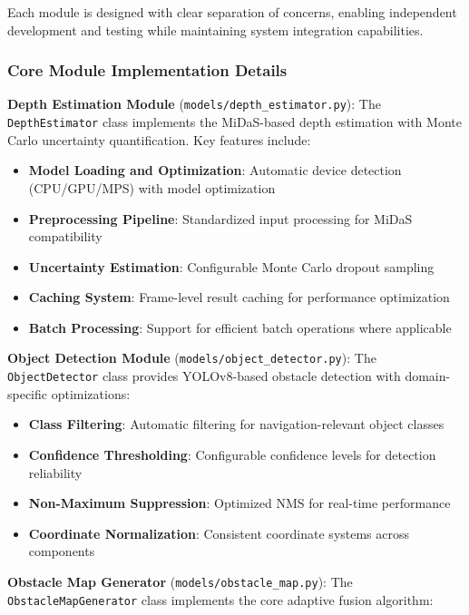 \documentclass[10pt]{article}
\begin{document}
Each module is designed with clear separation of concerns, enabling independent development and testing while maintaining system integration capabilities.

\subsubsection{Core Module Implementation Details}

\textbf{Depth Estimation Module} (\texttt{models/depth\_estimator.py}):
The \texttt{DepthEstimator} class implements the MiDaS-based depth estimation with Monte Carlo uncertainty quantification. Key features include:

\begin{itemize}
\item \textbf{Model Loading and Optimization}: Automatic device detection (CPU/GPU/MPS) with model optimization
\item \textbf{Preprocessing Pipeline}: Standardized input processing for MiDaS compatibility
\item \textbf{Uncertainty Estimation}: Configurable Monte Carlo dropout sampling
\item \textbf{Caching System}: Frame-level result caching for performance optimization
\item \textbf{Batch Processing}: Support for efficient batch operations where applicable
\end{itemize}

\textbf{Object Detection Module} (\texttt{models/object\_detector.py}):
The \texttt{ObjectDetector} class provides YOLOv8-based obstacle detection with domain-specific optimizations:

\begin{itemize}
\item \textbf{Class Filtering}: Automatic filtering for navigation-relevant object classes
\item \textbf{Confidence Thresholding}: Configurable confidence levels for detection reliability
\item \textbf{Non-Maximum Suppression}: Optimized NMS for real-time performance
\item \textbf{Coordinate Normalization}: Consistent coordinate systems across components
\end{itemize}

\textbf{Obstacle Map Generator} (\texttt{models/obstacle\_map.py}):
The \texttt{ObstacleMapGenerator} class implements the core adaptive fusion algorithm:
\end{document}
